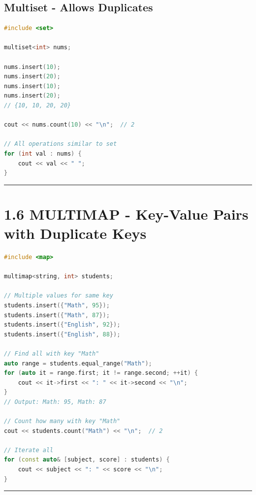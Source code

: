 \hypertarget{multiset---allows-duplicates}{%
\subsection{Multiset - Allows
Duplicates}\label{multiset---allows-duplicates}}

\begin{lstlisting}[language={C++}]
#include <set>

multiset<int> nums;

nums.insert(10);
nums.insert(20);
nums.insert(10);
nums.insert(20);
// {10, 10, 20, 20}

cout << nums.count(10) << "\n";  // 2

// All operations similar to set
for (int val : nums) {
    cout << val << " ";
}
\end{lstlisting}

\begin{center}\rule{0.5\linewidth}{0.5pt}\end{center}

\hypertarget{multimap---key-value-pairs-with-duplicate-keys}{%
\section{1.6 MULTIMAP - Key-Value Pairs with Duplicate
Keys}\label{multimap---key-value-pairs-with-duplicate-keys}}

\begin{lstlisting}[language={C++}]
#include <map>

multimap<string, int> students;

// Multiple values for same key
students.insert({"Math", 95});
students.insert({"Math", 87});
students.insert({"English", 92});
students.insert({"English", 88});

// Find all with key "Math"
auto range = students.equal_range("Math");
for (auto it = range.first; it != range.second; ++it) {
    cout << it->first << ": " << it->second << "\n";
}
// Output: Math: 95, Math: 87

// Count how many with key "Math"
cout << students.count("Math") << "\n";  // 2

// Iterate all
for (const auto& [subject, score] : students) {
    cout << subject << ": " << score << "\n";
}
\end{lstlisting}

\begin{center}\rule{0.5\linewidth}{0.5pt}\end{center}

